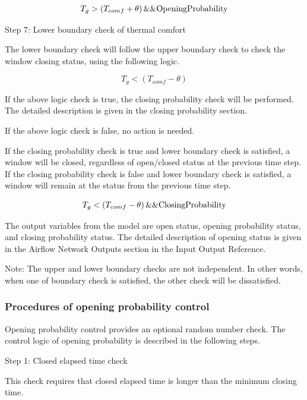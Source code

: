 \begin{equation}
T_g > \left(T_{comf} + \theta\right) \&\& \rm{OpeningProbability}
\end{equation}

Step 7: Lower boundary check of thermal comfort

The lower boundary check will follow the upper boundary check to check the window closing status, using the following logic.

\begin{equation}
T_g < \left(T_{comf} - \theta\right)
\end{equation}

If the above logic check is true, the closing probability check will be performed. The detailed description is given in the closing probability section.

If the above logic check is false, no action is needed.

If the closing probability check is true and lower boundary check is satisfied, a window will be closed, regardless of open/closed status at the previous time step. If the closing probability check is false and lower boundary check is satisfied, a window will remain at the status from the previous time step.

\begin{equation}
T_g < \left(T_{comf} - \theta\right) \&\& \rm{ClosingProbability}
\end{equation}

The output variables from the model are open status, opening probability status, and closing probability status. The detailed description of opening status is given in the Airflow Network Outputs section in the Input Output Reference.

Note: The upper and lower boundary checks are not independent. In other words, when one of boundary check is satisfied, the other check will be dissatisfied.

\subsubsection{Procedures of opening probability control}\label{procedures-of-opening-probability-control}

Opening probability control provides an optional random number check. The control logic of opening probability is described in the following steps.

Step 1: Closed elapsed time check

This check requires that closed elapsed time is longer than the minimum closing time.

